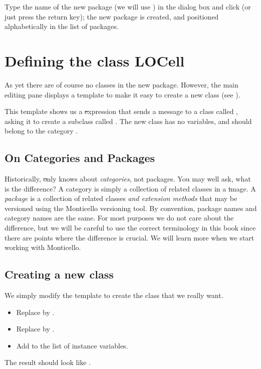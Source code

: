 \documentclass[a4paper,10pt,twoside]{book}
\begin{document}
Type the name of the new package (we will use ) in the dialog box and click  (or just press the return key); the new package is created, and positioned alphabetically in the list of packages.

\section{Defining the class LOCell}

As yet there are  of course no classes in the new package. However, the main editing pane displays a template to make it easy to create a new class (see ).

This template shows us a \st expression that sends a message to a class called , asking it to create a subclass called .  The new class has no variables, and should belong to the category .

\subsection{On Categories and Packages}

Historically, \st only knows about \emph{categories}, not packages.
You may well ask, what is the difference?
A category is simply a collection of related classes in a \st image.
A \emph{package} is a collection of related classes \emph{and extension methods} that may be versioned using the Monticello versioning tool.
By convention, package names and category names are the same.
For most purposes we do not care about the difference, but we will be careful to use the correct terminology in this book since there are points where the difference is crucial.
We will learn more when we start working with Monticello.

\subsection{Creating a new class}

We simply modify the template to create the class that we really want.

\begin{itemize}
  \item Replace  by .
  \item Replace  by .
  \item Add  to the list of instance variables.
\end{itemize}
The result should look like .
\end{document}
